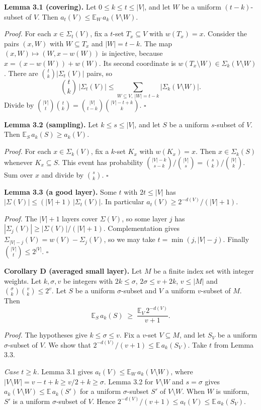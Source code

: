 \documentclass[10pt,a4paper]{article}
\begin{document}
\textbf{Lemma 3.1 (covering).} Let $0 \le k \le t \le |V|$, and let $W$ be a uniform $(t-k)$-subset of $V$. Then
$a_t(V) \le \mathbb E_W\, a_k(V\setminus W)$.

\emph{Proof.} For each $x \in \Sigma_t(V)$, fix a $t$-set $T_x \subseteq V$ with $w(T_x) = x$. Consider the pairs $(x, W)$ with
$W \subseteq T_x$ and $|W| = t - k$. The map $(x, W) \mapsto (W, x - w(W))$ is injective, because
$x = (x - w(W)) + w(W)$. Its second coordinate is $w(T_x\setminus W) \in \Sigma_k(V\setminus W)$. There are
$\binom tk|\Sigma_t(V)|$ pairs, so
\[\binom tk\,|\Sigma_t(V)| \le \sum_{W\subseteq V,\ |W| = t-k}|\Sigma_k(V\setminus W)|.\]
Divide by $\binom{|V|}{t}\binom tk = \binom{|V|}{t-k}\binom{|V| - t + k}{k}$. $\square$

\textbf{Lemma 3.2 (sampling).} Let $k \le s \le |V|$, and let $S$ be a uniform $s$-subset of $V$. Then
$\mathbb E_S\, a_k(S) \ge a_k(V)$.

\emph{Proof.} For each $x \in \Sigma_k(V)$, fix a $k$-set $K_x$ with $w(K_x) = x$. Then $x \in \Sigma_k(S)$ whenever
$K_x \subseteq S$. This event has probability $\binom{|V|-k}{s-k}\big/\binom{|V|}{s} = \binom sk\big/\binom{|V|}{k}$.
Sum over $x$ and divide by $\binom sk$. $\square$

\textbf{Lemma 3.3 (a good layer).} Some $t$ with $2t \le |V|$ has $|\Sigma(V)| \le (|V|+1)\,|\Sigma_t(V)|$. In particular
$a_t(V) \ge 2^{-d(V)}/(|V|+1)$.

\emph{Proof.} The $|V| + 1$ layers cover $\Sigma(V)$, so some layer $j$ has $|\Sigma_j(V)| \ge |\Sigma(V)|/(|V|+1)$.
Complementation gives $\Sigma_{|V|-j}(V) = w(V) - \Sigma_j(V)$, so we may take $t = \min(j, |V| - j)$. Finally
$\binom{|V|}{t} \le 2^{|V|}$. $\square$

\textbf{Corollary D (averaged small layer).} Let $M$ be a finite index set with integer weights. Let $k, \sigma, v$ be
integers with $2k \le \sigma$, $2\sigma \le v + 2k$, $v \le |M|$ and $\binom\sigma k\binom vk \le 2^v$. Let $S$ be a
uniform $\sigma$-subset and $V$ a uniform $v$-subset of $M$. Then
\[\mathbb E_S\, a_k(S) \;\ge\; \frac{\mathbb E_V\, 2^{-d(V)}}{v+1}.\]

\emph{Proof.} The hypotheses give $k \le \sigma \le v$. Fix a $v$-set $V \subseteq M$, and let $S_V$ be a uniform
$\sigma$-subset of $V$. We show that $2^{-d(V)}/(v+1) \le \mathbb E\, a_k(S_V)$. Take $t$ from Lemma 3.3.

\emph{Case $t \ge k$.} Lemma 3.1 gives $a_t(V) \le \mathbb E_W\, a_k(V\setminus W)$, where
$|V\setminus W| = v - t + k \ge v/2 + k \ge \sigma$. Lemma 3.2 for $V \setminus W$ and $s = \sigma$ gives
$a_k(V\setminus W) \le \mathbb E\, a_k(S')$ for a uniform $\sigma$-subset $S'$ of $V\setminus W$. When $W$ is uniform,
$S'$ is a uniform $\sigma$-subset of $V$. Hence $2^{-d(V)}/(v+1) \le a_t(V) \le \mathbb E\, a_k(S_V)$.
\end{document}

